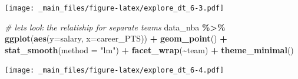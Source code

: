 \documentclass[
]{book}
\newenvironment{Shaded}{\begin{snugshade}}{\end{snugshade}}
\newcommand{\AttributeTok}[1]{\textcolor[rgb]{0.13,0.29,0.53}{#1}}
\newcommand{\CommentTok}[1]{\textcolor[rgb]{0.56,0.35,0.01}{\textit{#1}}}
\newcommand{\FunctionTok}[1]{\textcolor[rgb]{0.13,0.29,0.53}{\textbf{#1}}}
\newcommand{\NormalTok}[1]{#1}
\newcommand{\SpecialCharTok}[1]{\textcolor[rgb]{0.81,0.36,0.00}{\textbf{#1}}}
\newcommand{\StringTok}[1]{\textcolor[rgb]{0.31,0.60,0.02}{#1}}
\begin{document}
\texttt{[image: \_main\_files/figure-latex/explore\_dt\_6-3.pdf]}

\begin{Shaded}
\begin{Highlighting}[]
\CommentTok{\# let\textquotesingle{}s look the relatiship for separate teams}
\NormalTok{data\_nba }\SpecialCharTok{\%\textgreater{}\%} 
  \FunctionTok{ggplot}\NormalTok{(}\FunctionTok{aes}\NormalTok{(}\AttributeTok{y=}\NormalTok{salary, }\AttributeTok{x=}\NormalTok{career\_PTS)) }\SpecialCharTok{+}
    \FunctionTok{geom\_point}\NormalTok{() }\SpecialCharTok{+} 
     \FunctionTok{stat\_smooth}\NormalTok{(}\AttributeTok{method =} \StringTok{"lm"}\NormalTok{) }\SpecialCharTok{+} 
        \FunctionTok{facet\_wrap}\NormalTok{(}\SpecialCharTok{\textasciitilde{}}\NormalTok{team) }\SpecialCharTok{+} 
       \FunctionTok{theme\_minimal}\NormalTok{()}
\end{Highlighting}
\end{Shaded}

\texttt{[image: \_main\_files/figure-latex/explore\_dt\_6-4.pdf]}
\end{document}
